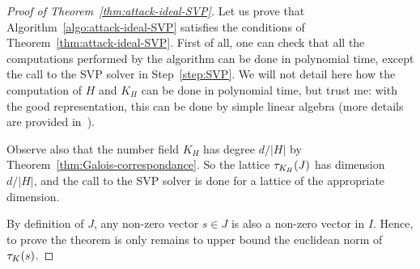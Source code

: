 \begin{proof}[Proof of Theorem~\ref{thm:attack-ideal-SVP}]
Let us prove that Algorithm~\ref{algo:attack-ideal-SVP} satisfies the conditions of Theorem~\ref{thm:attack-ideal-SVP}. First of all, one can check that all the computations performed by the algorithm can be done in polynomial time, except the call to the SVP solver in Step~\ref{step:SVP}. We will not detail here how the computation of $H$ and $K_H$ can be done in polynomial time, but trust me: with the good representation, this can be done by simple linear algebra (more details are provided in~\cite{BGP22}).

Observe also that the number field $K_H$ has degree $d/|H|$ by Theorem~\ref{thm:Galois-correspondance}. So the lattice $\tau_{K_H}(J)$ has dimension $d/|H|$, and the call to the SVP solver is done for a lattice of the appropriate dimension.

By definition of $J$, any non-zero vector $s \in J$ is also a non-zero vector in $I$. Hence, to prove the theorem is only remains to upper bound the euclidean norm of $\tau_K(s)$.


\end{proof}
